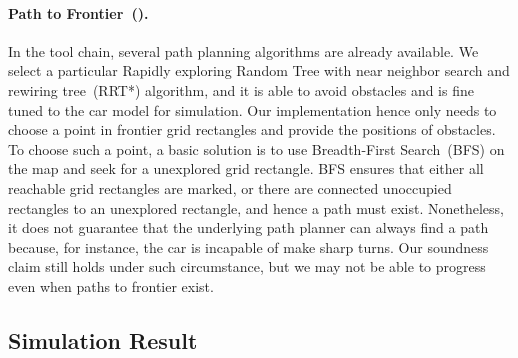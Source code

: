\paragraph{Path to Frontier~(\PathToFrontier).}
In the \CyPhyHouse tool chain, several path planning algorithms are already available.
We select a particular Rapidly exploring Random Tree with near neighbor search and rewiring tree~(RRT*) algorithm,
and it is able to avoid obstacles and is fine tuned to the car model for simulation.
Our \PathToFrontier implementation hence only needs to choose a point in frontier grid rectangles and provide the positions of obstacles.
To choose such a point, a basic solution is to use Breadth-First Search~(BFS) on the map and seek for a unexplored grid rectangle.
BFS ensures that either all reachable grid rectangles are marked,
or there are connected unoccupied rectangles to an unexplored rectangle, and hence a path must exist.
Nonetheless, it does not guarantee that the underlying path planner can always find a path because,
for instance, the car is incapable of make sharp turns.
Our soundness claim still holds under such circumstance, but we may not be able to progress even when paths to frontier exist.


\subsection{Simulation Result}


